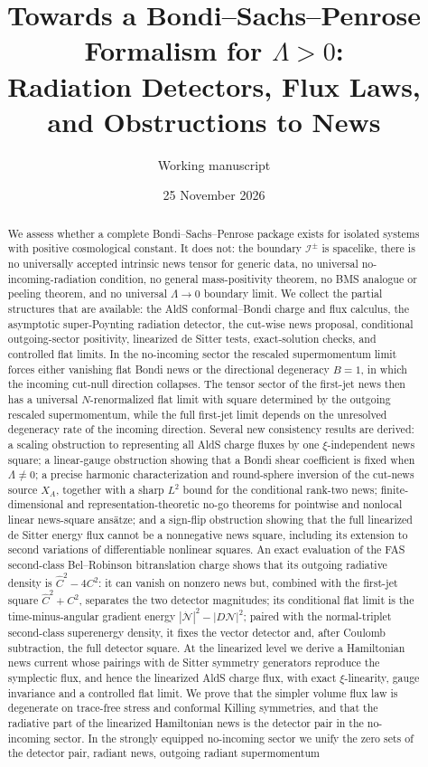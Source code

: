 \documentclass[11pt,a4paper]{article}
\title{Towards a Bondi--Sachs--Penrose Formalism for \(\Lambda>0\):\\
Radiation Detectors, Flux Laws, and Obstructions to News}
\author{Working manuscript}
\date{25 November 2026}
\newcommand{\scri}{\mathscr{I}}
\begin{document}
\maketitle

\begin{abstract}
We assess whether a complete Bondi--Sachs--Penrose package exists for isolated systems with positive cosmological constant.  It does not: the boundary \(\scri^\pm\) is spacelike, there is no universally accepted intrinsic news tensor for generic data, no universal no-incoming-radiation condition, no general mass-positivity theorem, no BMS analogue or peeling theorem, and no universal \(\Lambda\to0\) boundary limit.  We collect the partial structures that are available: the AldS conformal--Bondi charge and flux calculus, the asymptotic super-Poynting radiation detector, the cut-wise news proposal, conditional outgoing-sector positivity, linearized de Sitter tests, exact-solution checks, and controlled flat limits.  In the no-incoming sector the rescaled supermomentum limit forces either vanishing flat Bondi news or the directional degeneracy \(B=1\), in which the incoming cut-null direction collapses.  The tensor sector of the first-jet news then has a universal \(N\)-renormalized flat limit with square determined by the outgoing rescaled supermomentum, while the full first-jet limit depends on the unresolved degeneracy rate of the incoming direction.  Several new consistency results are derived: a scaling obstruction to representing all AldS charge fluxes by one \(\xi\)-independent news square; a linear-gauge obstruction showing that a Bondi shear coefficient is fixed when \(\Lambda\neq0\); a precise harmonic characterization and round-sphere inversion of the cut-news source \(X_A\), together with a sharp \(L^2\) bound for the conditional rank-two news; finite-dimensional and representation-theoretic no-go theorems for pointwise and nonlocal linear news-square ans{\"a}tze; and a sign-flip obstruction showing that the full linearized de Sitter energy flux cannot be a nonnegative news square, including its extension to second variations of differentiable nonlinear squares.  An exact evaluation of the FAS second-class Bel--Robinson bitranslation charge shows that its outgoing radiative density is \(\hat C^2-4C^2\): it can vanish on nonzero news but, combined with the first-jet square \(\hat C^2+C^2\), separates the two detector magnitudes; its conditional flat limit is the time-minus-angular gradient energy \(|\dot{\mathcal N}|^2-|D\mathcal N|^2\); paired with the normal-triplet second-class superenergy density, it fixes the vector detector and, after Coulomb subtraction, the full detector square.  At the linearized level we derive a Hamiltonian news current whose pairings with de Sitter symmetry generators reproduce the symplectic flux, and hence the linearized AldS charge flux, with exact \(\xi\)-linearity, gauge invariance and a controlled flat limit.  We prove that the simpler volume flux law is degenerate on trace-free stress and conformal Killing symmetries, and that the radiative part of the linearized Hamiltonian news is the detector pair in the no-incoming sector.  In the strongly equipped no-incoming sector we unify the zero sets of the detector pair, radiant news, outgoing radiant supermomentum 
\end{abstract}
\end{document}
